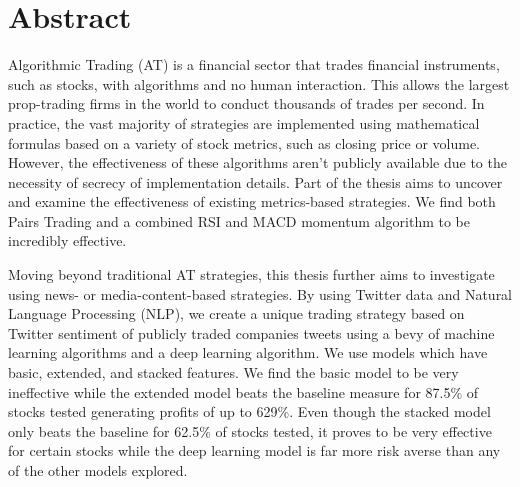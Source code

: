\documentclass[../thesis.tex]{subfiles}
\begin{document}
\chapter*{Abstract}

Algorithmic Trading (AT) is a financial sector that trades financial instruments, such as stocks, with algorithms and no human interaction. This allows the largest prop-trading firms in the world to conduct thousands of trades per second. In practice, the vast majority of strategies are implemented using mathematical formulas based on a variety of stock metrics, such as closing price or volume. However, the effectiveness of these algorithms aren't publicly available due to the necessity of secrecy of implementation details. Part of the thesis aims to uncover and examine the effectiveness of existing metrics-based strategies. We find both Pairs Trading and a combined RSI and MACD momentum algorithm to be incredibly effective.

Moving beyond traditional AT strategies, this thesis further aims to investigate using news- or media-content-based strategies. By using Twitter data and Natural Language Processing (NLP), we create a unique trading strategy based on Twitter sentiment of publicly traded companies tweets using a bevy of machine learning algorithms and a deep learning algorithm. We use models which have basic, extended, and stacked features. We find the basic model to be very ineffective while the extended model beats the baseline measure for 87.5\% of stocks tested generating profits of up to 629\%. Even though the stacked model only beats the baseline for 62.5\% of stocks tested, it proves to be very effective for certain stocks while the deep learning model is far more risk averse than any of the other models explored.
\end{document}
